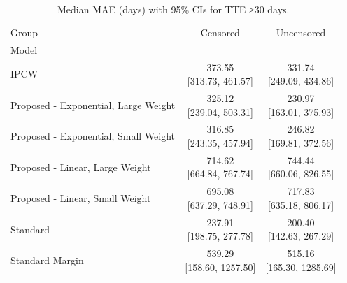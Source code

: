 \begin{table}
\caption{Median MAE (days) with 95\% CIs for TTE ≥30 days.}
\label{tab:mae_results_ge30}
\begin{tabular}{lcc}
\toprule
Group & Censored & Uncensored \\
Model &  &  \\
\midrule
IPCW & \makecell{373.55 \\ [313.73, 461.57]} & \makecell{331.74 \\ [249.09, 434.86]} \\
Proposed - Exponential, Large Weight & \makecell{325.12 \\ [239.04, 503.31]} & \makecell{230.97 \\ [163.01, 375.93]} \\
Proposed - Exponential, Small Weight & \makecell{316.85 \\ [243.35, 457.94]} & \makecell{246.82 \\ [169.81, 372.56]} \\
Proposed - Linear, Large Weight & \makecell{714.62 \\ [664.84, 767.74]} & \makecell{744.44 \\ [660.06, 826.55]} \\
Proposed - Linear, Small Weight & \makecell{695.08 \\ [637.29, 748.91]} & \makecell{717.83 \\ [635.18, 806.17]} \\
Standard & \makecell{237.91 \\ [198.75, 277.78]} & \makecell{200.40 \\ [142.63, 267.29]} \\
Standard
Margin & \makecell{539.29 \\ [158.60, 1257.50]} & \makecell{515.16 \\ [165.30, 1285.69]} \\
\bottomrule
\end{tabular}
\end{table}
